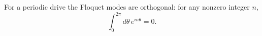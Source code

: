\documentclass{article}
\begin{document}
For a periodic drive the Floquet modes are orthogonal: for any nonzero integer $n$,
\begin{equation}
\int_0^{2\pi} d\theta\, e^{i n\theta} = 0 .
\label{eq:orth}
\end{equation}
\end{document}
